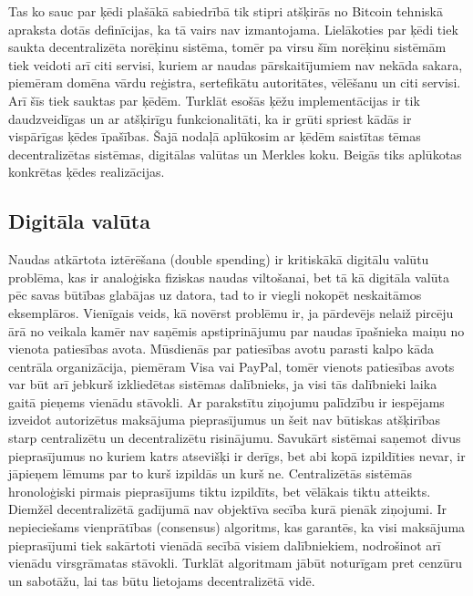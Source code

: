 Tas ko sauc par ķēdi plašākā sabiedrībā tik stipri atšķirās no Bitcoin tehniskā apraksta\cite{nakamoto08} dotās definīcijas, ka tā vairs nav izmantojama. 
Lielākoties par ķēdi tiek saukta decentralizēta norēķinu sistēma, tomēr pa virsu šīm norēķinu sistēmām tiek veidoti arī citi servisi, kuriem ar naudas pārskaitījumiem nav nekāda sakara, piemēram domēna vārdu reģistra, sertefikātu autoritātes, vēlēšanu un citi servisi.\cite{namecoin} Arī šīs tiek sauktas par ķēdēm.
Turklāt esošās ķēžu implementācijas ir tik daudzveidīgas un ar atšķirīgu funkcionalitāti, ka ir grūti spriest kādās ir vispārīgas ķēdes īpašības.
Šajā nodaļā aplūkosim ar ķēdēm saistītas tēmas \textemdash{} decentralizētas sistēmas, digitālas valūtas un Merkles koku. Beigās tiks aplūkotas konkrētas ķēdes realizācijas.

\subsection{Digitāla valūta}
Naudas atkārtota iztērēšana (double spending) ir kritiskākā digitālu valūtu problēma, kas ir analoģiska fiziskas naudas viltošanai, bet tā kā digitāla valūta pēc savas būtības glabājas uz datora, tad to ir viegli nokopēt neskaitāmos eksemplāros. Vienīgais veids, kā novērst problēmu ir, ja pārdevējs nelaiž pircēju ārā no veikala kamēr nav saņēmis apstiprinājumu par naudas īpašnieka maiņu no vienota patiesības avota.\cite{frankel96}
Mūsdienās par patiesības avotu parasti kalpo kāda centrāla organizācija, piemēram Visa vai PayPal, tomēr vienots patiesības avots var būt arī jebkurš izkliedētas sistēmas dalībnieks, ja visi tās dalībnieki laika gaitā pieņems vienādu stāvokli.
Ar parakstītu ziņojumu palīdzību ir iespējams izveidot autorizētus maksājuma pieprasījumus un šeit nav būtiskas atšķirības starp centralizētu un decentralizētu risinājumu. Savukārt sistēmai saņemot divus pieprasījumus no kuriem katrs atsevišķi ir derīgs, bet abi kopā izpildīties nevar, ir jāpieņem lēmums par to kurš izpildās un kurš ne.
Centralizētās sistēmās hronoloģiski pirmais pieprasījums tiktu izpildīts, bet vēlākais tiktu atteikts. Diemžēl decentralizētā gadījumā nav objektīva secība kurā pienāk ziņojumi. Ir nepieciešams vienprātības (consensus) algoritms, kas garantēs, ka visi maksājuma pieprasījumi tiek sakārtoti vienādā secībā visiem dalībniekiem, nodrošinot arī vienādu virsgrāmatas stāvokli.
Turklāt algoritmam jābūt noturīgam pret cenzūru un sabotāžu, lai tas būtu lietojams decentralizētā vidē.

